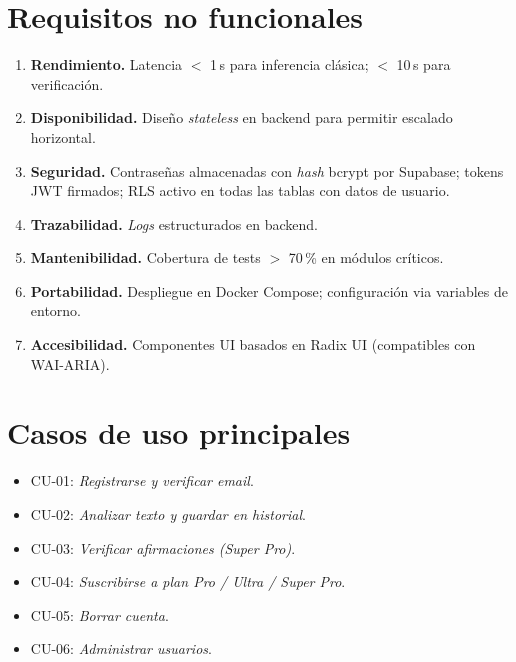 \section{Requisitos no funcionales}

\begin{enumerate}[label=RNF-\arabic*,leftmargin=*,itemsep=0.2em]
  \item \textbf{Rendimiento.} Latencia $<$ 1\,s para inferencia
        clásica; $<$ 10\,s para verificación.
  \item \textbf{Disponibilidad.} Diseño \emph{stateless} en backend
        para permitir escalado horizontal.
  \item \textbf{Seguridad.} Contraseñas almacenadas con \emph{hash}
        bcrypt por Supabase; tokens JWT firmados; RLS activo en todas
        las tablas con datos de usuario.
  \item \textbf{Trazabilidad.} \emph{Logs} estructurados en backend.
  \item \textbf{Mantenibilidad.} Cobertura de tests $>$ 70\,\% en
        módulos críticos.
  \item \textbf{Portabilidad.} Despliegue en Docker Compose;
        configuración via variables de entorno.
  \item \textbf{Accesibilidad.} Componentes UI basados en Radix UI
        (compatibles con WAI-ARIA).
\end{enumerate}

\section{Casos de uso principales}

\begin{itemize}[leftmargin=*,itemsep=0.2em]
  \item CU-01: \emph{Registrarse y verificar email}.
  \item CU-02: \emph{Analizar texto y guardar en historial}.
  \item CU-03: \emph{Verificar afirmaciones (Super Pro)}.
  \item CU-04: \emph{Suscribirse a plan Pro / Ultra / Super Pro}.
  \item CU-05: \emph{Borrar cuenta}.
  \item CU-06: \emph{Administrar usuarios}.
\end{itemize}
